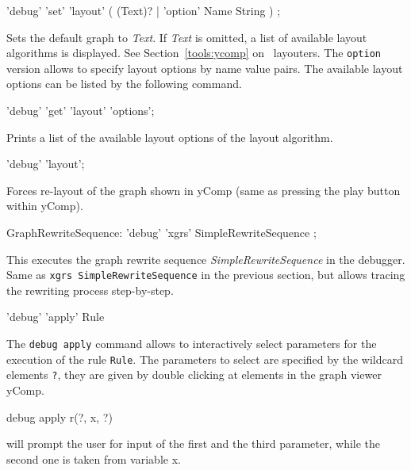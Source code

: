 \begin{rail}
  'debug' 'set' 'layout' ( (Text)? | 'option' Name String ) ;
\end{rail}
Sets the default graph  to \emph{Text}.
If \emph{Text} is omitted, a list of available layout algorithms is displayed.
See Section~\ref{tools:ycomp} on \yComp\ layouters.
The \texttt{option} version allows to specify layout options by name value pairs.
The available layout options can be listed by the following command.

\begin{rail}
  'debug' 'get' 'layout' 'options';
\end{rail}
Prints a list of the available layout options of the layout algorithm.

\begin{rail}
  'debug' 'layout';
\end{rail}
Forces re-layout of the graph shown in yComp (same as pressing the play button within yComp).

\begin{rail}
  GraphRewriteSequence: 'debug' 'xgrs' SimpleRewriteSequence ;
\end{rail}
This executes the graph rewrite sequence \emph{SimpleRewriteSequence} in the debugger.
Same as \texttt{xgrs SimpleRewriteSequence} in the previous section, but allows tracing the rewriting process step-by-step. 

\begin{rail}
'debug' 'apply' Rule
\end{rail}
The \texttt{debug apply} command allows to interactively select parameters for the execution of the rule \texttt{Rule}.
The parameters to select are specified by the wildcard elements \texttt{?}, they are given by double clicking at elements in the graph viewer yComp.

\begin{example}
\begin{grshelllet}
debug apply r(?, x, ?)
\end{grshelllet}
will prompt the user for input of the first and the third parameter, while the second one is taken from variable x.
\end{example}


